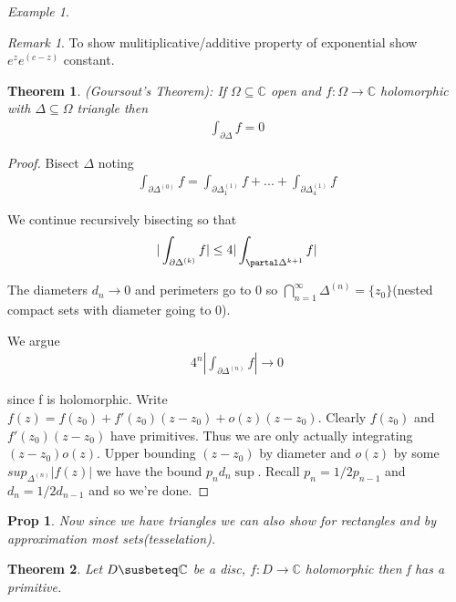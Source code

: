 \documentclass[11pt]{article}
\newcommand{\C}{\mathbb{C}}
\newtheorem{theorem}{Theorem}
\newtheorem{prop}{Prop}
\theoremstyle{remark}
\newtheorem{remark}{Remark}
\newtheorem{example}{Example}
\begin{document}
\begin{example}
\begin{remark}
	To show mulitiplicative/additive property of exponential show $e^ze^(c-z)$ constant.
\end{remark}

\begin{theorem}
	(Goursout's Theorem): If $\Omega \subseteq \C$ open and $f : \Omega \to \C$ holomorphic with $\Delta \subseteq \Omega$ triangle then 
	\begin{align*}
		\int_{\partial \Delta} f = 0
	\end{align*}
\end{theorem}

\begin{proof}
	Bisect $\Delta$ noting
	\begin{align*}
		\int_{\partial \Delta^{(0)}} f = \int_{\partial \Delta^{(1)}_1} f + ... + \int_{\partial \Delta^{(1)}_4} f
	\end{align*}

	We continue recursively bisecting so that
	\begin{align*}
		|\int_{\partial \Delta^{(k)}} f| \leq 4 |\int_{\partal \Delta^{k+1}} f|
	\end{align*}

	The diameters $d_n \to 0$ and perimeters go to 0 so $\bigcap_{n=1}^{\infty} \Delta^{(n)} = \{z_0\}$(nested compact sets with diameter going to 0).

	We argue
	\begin{align*}
		4^n |\int_{\partial \Delta^{(n)}} f| \to 0
	\end{align*}

	since f is holomorphic. Write $f(z) = f(z_0) + f'(z_0)(z-z_0) + o(z)(z-z_0)$. Clearly $f(z_0)$ and $f'(z_0)(z-z_0)$ have primitives. Thus we are only actually integrating $(z-z_0)o(z)$. Upper bounding $(z-z_0)$ by diameter and $o(z)$ by some $sup_{\Delta^{(n)}} |f(z)|$ we have the bound $p_n d_n \sup$. Recall $p_n = 1/2p_{n-1}$ and $d_n = 1/2 d_{n-1}$ and so we're done.
\end{proof}

\begin{prop}
	Now since we have triangles we can also show for rectangles and by approximation most sets(tesselation). 
\end{prop}

\begin{theorem}
	Let $D \susbeteq \C$ be a disc, $f: D \to \C$ holomorphic then f has a primitive. 
\end{theorem}


\end{example}
\end{document}
